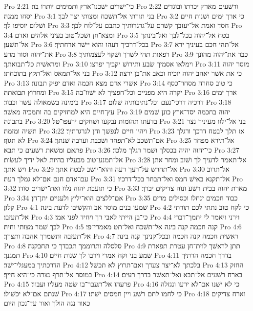 Pro 2:21  כי־ישׁרים ישׁכנו־ארץ ותמימים יותרו בה׃
Pro 2:22  ורשׁעים מארץ יכרתו ובוגדים יסחו ממנה׃
Pro 3:1  בני תורתי אל־תשׁכח ומצותי יצר לבך׃
Pro 3:2  כי ארך ימים ושׁנות חיים ושׁלום יוסיפו לך׃
Pro 3:3  חסד ואמת אל־יעזבך קשׁרם על־גרגרותיך כתבם על־לוח לבך׃
Pro 3:4  ומצא־חן ושׂכל־טוב בעיני אלהים ואדם׃
Pro 3:5  בטח אל־יהוה בכל־לבך ואל־בינתך אל־תשׁען׃
Pro 3:6  בכל־דרכיך דעהו והוא יישׁר ארחתיך׃
Pro 3:7  אל־תהי חכם בעיניך ירא את־יהוה וסור מרע׃
Pro 3:8  רפאות תהי לשׁרך ושׁקוי לעצמותיך׃
Pro 3:9  כבד את־יהוה מהונך ומראשׁית כל־תבואתך׃
Pro 3:10  וימלאו אסמיך שׂבע ותירושׁ יקביך יפרצו׃
Pro 3:11  מוסר יהוה בני אל־תמאס ואל־תקץ בתוכחתו׃
Pro 3:12  כי את אשׁר יאהב יהוה יוכיח וכאב את־בן ירצה׃
Pro 3:13  אשׁרי אדם מצא חכמה ואדם יפיק תבונה׃
Pro 3:14  כי טוב סחרה מסחר־כסף ומחרוץ תבואתה׃
Pro 3:15  יקרה היא מפניים וכל־חפציך לא ישׁוו־בה׃
Pro 3:16  ארך ימים בימינה בשׂמאולה עשׁר וכבוד׃
Pro 3:17  דרכיה דרכי־נעם וכל־נתיבותיה שׁלום׃
Pro 3:18  עץ־חיים היא למחזיקים בה ותמכיה מאשׁר׃
Pro 3:19  יהוה בחכמה יסד־ארץ כונן שׁמים בתבונה׃
Pro 3:20  בדעתו תהומות נבקעו ושׁחקים ירעפו־טל׃
Pro 3:21  בני אל־ילזו מעיניך נצר תשׁיה ומזמה׃
Pro 3:22  ויהיו חיים לנפשׁך וחן לגרגרתיך׃
Pro 3:23  אז תלך לבטח דרכך ורגלך לא תגוף׃
Pro 3:24  אם־תשׁכב לא־תפחד ושׁכבת וערבה שׁנתך׃
Pro 3:25  אל־תירא מפחד פתאם ומשׁאת רשׁעים כי תבא׃
Pro 3:26  כי־יהוה יהיה בכסלך ושׁמר רגלך מלכד׃
Pro 3:27  אל־תמנע־טוב מבעליו בהיות לאל ידיך לעשׂות׃
Pro 3:28  אל־תאמר לרעיך לך ושׁוב ומחר אתן וישׁ אתך׃
Pro 3:29  אל־תחרשׁ על־רעך רעה והוא־יושׁב לבטח אתך׃
Pro 3:30  אל־תרוב עם־אדם חנם אם־לא גמלך רעה׃
Pro 3:31  אל־תקנא באישׁ חמס ואל־תבחר בכל־דרכיו׃
Pro 3:32  כי תועבת יהוה נלוז ואת־ישׁרים סודו׃
Pro 3:33  מארת יהוה בבית רשׁע ונוה צדיקים יברך׃
Pro 3:34  אם־ללצים הוא־יליץ ולעניים יתן־חן׃
Pro 3:35  כבוד חכמים ינחלו וכסילים מרים קלון׃
Pro 4:1  שׁמעו בנים מוסר אב והקשׁיבו לדעת בינה׃
Pro 4:2  כי לקח טוב נתתי לכם תורתי אל־תעזבו׃
Pro 4:3  כי־בן הייתי לאבי רך ויחיד לפני אמי׃
Pro 4:4  וירני ויאמר לי יתמך־דברי לבך שׁמר מצותי וחיה׃
Pro 4:5  קנה חכמה קנה בינה אל־תשׁכח ואל־תט מאמרי־פי׃
Pro 4:6  אל־תעזבה ותשׁמרך אהבה ותצרך׃
Pro 4:7  ראשׁית חכמה קנה חכמה ובכל־קנינך קנה בינה׃
Pro 4:8  סלסלה ותרוממך תכבדך כי תחבקנה׃
Pro 4:9  תתן לראשׁך לוית־חן עטרת תפארת תמגנך׃
Pro 4:10  שׁמע בני וקח אמרי וירבו לך שׁנות חיים׃
Pro 4:11  בדרך חכמה הרתיך הדרכתיך במעגלי־ישׁר׃
Pro 4:12  בלכתך לא־יצר צעדך ואם־תרוץ לא תכשׁל׃
Pro 4:13  החזק במוסר אל־תרף נצרה כי־היא חייך׃
Pro 4:14  בארח רשׁעים אל־תבא ואל־תאשׁר בדרך רעים׃
Pro 4:15  פרעהו אל־תעבר־בו שׂטה מעליו ועבור׃
Pro 4:16  כי לא ישׁנו אם־לא ירעו ונגזלה שׁנתם אם־לא יכשׁולו׃
Pro 4:17  כי לחמו לחם רשׁע ויין חמסים ישׁתו׃
Pro 4:18  וארח צדיקים כאור נגה הולך ואור עד־נכון היום׃
